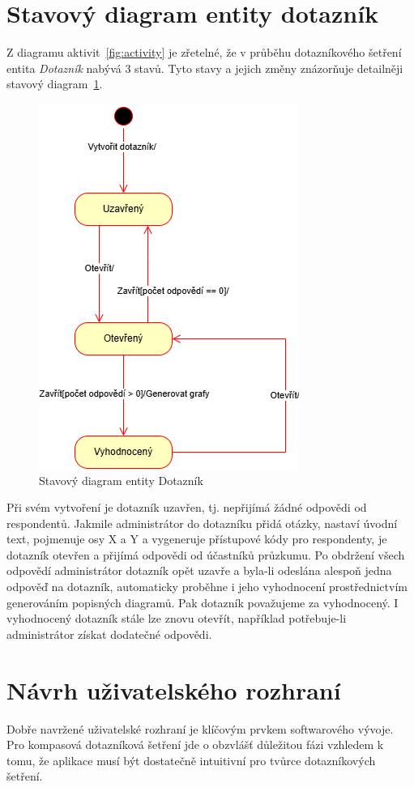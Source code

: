 \section{Stavový diagram entity dotazník}
Z diagramu aktivit~\ref{fig:activity} je zřetelné, že v průběhu dotazníkového šetření entita \textit{Dotazník}
nabývá 3 stavů. Tyto stavy a jejich změny znázorňuje detailněji stavový diagram~\ref{fig:state}.
\begin{figure}[h!]
    \centering
    \includegraphics[height=\textwidth]{images/state.drawio.png}
    \caption{Stavový diagram entity Dotazník}
    \label{fig:state}
\end{figure}
Při svém vytvoření je dotazník uzavřen, tj. nepřijímá žádné odpovědi od respondentů. Jakmile
administrátor do dotazníku přidá otázky, nastaví úvodní text, pojmenuje osy X a Y a vygeneruje přístupové
kódy pro respondenty, je dotazník otevřen a přijímá odpovědi od účastníků průzkumu. Po obdržení všech odpovědí
administrátor dotazník opět uzavře a byla-li odeslána alespoň jedna odpověď na dotazník, automaticky proběhne
i jeho vyhodnocení prostřednictvím generováním popisných diagramů. Pak dotazník považujeme za vyhodnocený.
I vyhodnocený dotazník stále lze znovu otevřít, například potřebuje-li administrátor získat dodatečné odpovědi.

\section{Návrh uživatelského rozhraní}
Dobře navržené uživatelské rozhraní je klíčovým prvkem softwarového vývoje. Pro kompasová dotazníková
šetření jde o obzvlášť důležitou fázi vzhledem k tomu, že aplikace musí být dostatečně intuitivní
pro tvůrce dotazníkových šetření. 

